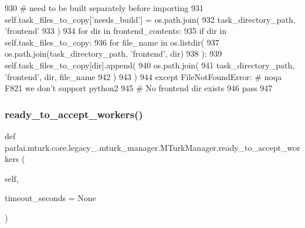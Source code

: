 \begin{DoxyCode}
930                 \textcolor{comment}{# need to be built separately before importing}
931                 self.task\_files\_to\_copy[\textcolor{stringliteral}{'needs\_build'}] = os.path.join(
932                     task\_directory\_path, \textcolor{stringliteral}{'frontend'}
933                 )
934             \textcolor{keywordflow}{for} dir \textcolor{keywordflow}{in} frontend\_contents:
935                 \textcolor{keywordflow}{if} dir \textcolor{keywordflow}{in} self.task\_files\_to\_copy:
936                     \textcolor{keywordflow}{for} file\_name \textcolor{keywordflow}{in} os.listdir(
937                         os.path.join(task\_directory\_path, \textcolor{stringliteral}{'frontend'}, dir)
938                     ):
939                         self.task\_files\_to\_copy[dir].append(
940                             os.path.join(
941                                 task\_directory\_path, \textcolor{stringliteral}{'frontend'}, dir, file\_name
942                             )
943                         )
944         \textcolor{keywordflow}{except} FileNotFoundError:  \textcolor{comment}{# noqa F821 we don't support python2}
945             \textcolor{comment}{# No frontend dir exists}
946             \textcolor{keywordflow}{pass}
947 
\end{DoxyCode}
\mbox{\label{classparlai_1_1mturk_1_1core_1_1legacy__2018_1_1mturk__manager_1_1MTurkManager_ac91c9354be146571c709509c81a05863}} 
\subsubsection{\texorpdfstring{ready\+\_\+to\+\_\+accept\+\_\+workers()}{ready\_to\_accept\_workers()}}
{\footnotesize\ttfamily def parlai.\+mturk.\+core.\+legacy\+\_.\+mturk\+\_\+manager.\+M\+Turk\+Manager.\+ready\+\_\+to\+\_\+accept\+\_\+workers (\begin{DoxyParamCaption}\item[{}]{self,  }\item[{}]{timeout\+\_\+seconds = {\ttfamily None} }\end{DoxyParamCaption})}

